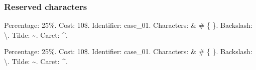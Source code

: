 \subsubsection*{Reserved characters}
\begin{referencecode}
Percentage: 25\%. Cost: 10\$. Identifier: case\_01.
Characters: \& \# \{ \}.
Backslash: \textbackslash{}. Tilde: \textasciitilde{}.
Caret: \textasciicircum{}.
\end{referencecode}

Percentage: 25\%. Cost: 10\$. Identifier: case\_01.
Characters: \& \# \{ \}.
Backslash: \textbackslash{}. Tilde: \textasciitilde{}.
Caret: \textasciicircum{}.
